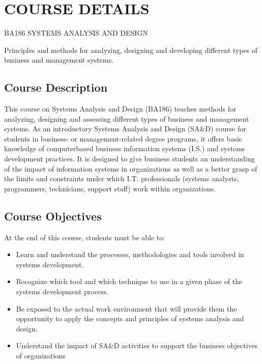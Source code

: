 

\hypertarget{course-details}{%
\section{COURSE DETAILS}\label{course-details}}

BA186 SYSTEMS ANALYSIS AND DESIGN

Principles and methods for analyzing, designing and developing different
types of business and management systems.

\hypertarget{course-description}{%
\subsection{Course Description}\label{course-description}}

This course on Systems Analysis and Design (BA186) teaches methods for
analyzing, designing and assessing different types of business and
management systems. As an introductory Systems Analysis and Design
(SA\&D) course for students in business- or management-related degree
programs, it offers basic knowledge of computerbased business
information systems (I.S.) and systems development practices. It is
designed to give business students an understanding of the impact of
information systems in organizations as well as a better grasp of the
limits and constraints under which I.T. professionals (systems analysts,
programmers, technicians, support staff) work within organizations.

\hypertarget{course-objectives}{%
\subsection{Course Objectives}\label{course-objectives}}

At the end of this course, students must be able to:

\begin{itemize}
\tightlist
\item
  Learn and understand the processes, methodologies and tools involved
  in systems development.
\item
  Recognize which tool and which technique to use in a given phase of
  the systems development process.
\item
  Be exposed to the actual work environment that will provide them the
  opportunity to apply the concepts and principles of systems analysis
  and design.
\item
  Understand the impact of SA\&D activities to support the business
  objectives of organizations
\end{itemize}

